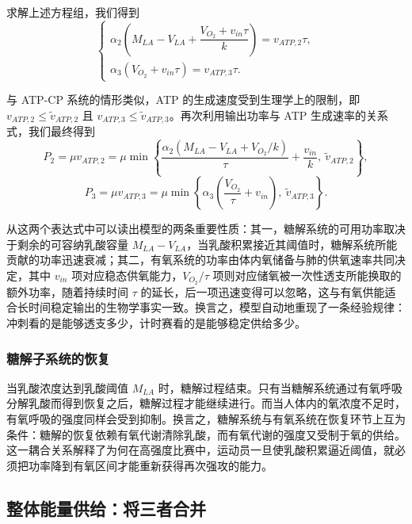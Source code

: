 \documentclass[11pt,a4paper]{ctexart}
\begin{document}
求解上述方程组，我们得到
\begin{equation}
\begin{cases}
\alpha_2\left(M_{LA}-V_{LA}+\dfrac{V_{O_2}+v_{in}\tau}{k}\right)=v_{ATP,2}\tau,\\[0.9em]
\alpha_3\left(V_{O_2}+v_{in}\tau\right)=v_{ATP,3}\tau.
\end{cases}
\end{equation}

与 ATP-CP 系统的情形类似，ATP 的生成速度受到生理学上的限制，即 $v_{ATP,2}\leqslant\tilde{v}_{ATP,2}$ 且 $v_{ATP,3}\leqslant\tilde{v}_{ATP,3}$。再次利用输出功率与 ATP 生成速率的关系式，我们最终得到
\begin{equation}
P_2=\mu v_{ATP,2}=\mu\min\left\{\frac{\alpha_2\left(M_{LA}-V_{LA}+V_{O_2}/k\right)}{\tau}+\frac{v_{in}}{k},\ \tilde{v}_{ATP,2}\right\},
\end{equation}
\begin{equation}
P_3=\mu v_{ATP,3}=\mu\min\left\{\alpha_3\left(\frac{V_{O_2}}{\tau}+v_{in}\right),\ \tilde{v}_{ATP,3}\right\}.
\end{equation}

从这两个表达式中可以读出模型的两条重要性质：其一，糖解系统的可用功率取决于剩余的可容纳乳酸容量 $M_{LA}-V_{LA}$，当乳酸积累接近其阈值时，糖解系统所能贡献的功率迅速衰减；其二，有氧系统的功率由体内氧储备与肺的供氧速率共同决定，其中 $v_{in}$ 项对应稳态供氧能力，$V_{O_2}/\tau$ 项则对应储氧被一次性透支所能换取的额外功率，随着持续时间 $\tau$ 的延长，后一项迅速变得可以忽略，这与有氧供能适合长时间稳定输出的生物学事实一致。换言之，模型自动地重现了一条经验规律：冲刺看的是能够透支多少，计时赛看的是能够稳定供给多少。

\subsubsection{糖解子系统的恢复}

当乳酸浓度达到乳酸阈值 $M_{LA}$ 时，糖解过程结束。只有当糖解系统通过有氧呼吸分解乳酸而得到恢复之后，糖解过程才能继续进行。而当人体内的氧浓度不足时，有氧呼吸的强度同样会受到抑制。换言之，糖解系统与有氧系统在恢复环节上互为条件：糖解的恢复依赖有氧代谢清除乳酸，而有氧代谢的强度又受制于氧的供给。这一耦合关系解释了为何在高强度比赛中，运动员一旦使乳酸积累逼近阈值，就必须把功率降到有氧区间才能重新获得再次强攻的能力。

\subsection{整体能量供给：将三者合并}
\end{document}
